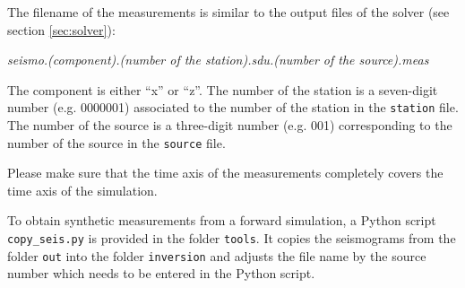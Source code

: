 	\medskip    
    	The filename of the measurements is similar to the output files of the solver (see section \ref{sec:solver}):
    	
    	\begin{center}%
				\emph{seismo.(component).(number of the station).sdu.(number of the source).meas}
		\end{center}
		
		The component is either ``x'' or ``z''. The number of the station is a seven-digit number (e.g. 0000001) associated to the number of the station in the \texttt{station} file. The number of the source is a three-digit number (e.g. 001) corresponding to the number of the source in the \texttt{source} file. 
		
		Please make sure that the time axis of the measurements completely covers the time axis of the simulation.
		
		To obtain synthetic measurements from a forward simulation, a Python script \texttt{copy\_seis.py} is provided in the folder \texttt{tools}. It copies the seismograms from the folder \texttt{out} into the folder \texttt{inversion} and adjusts the file name by the source number which needs to be entered in the Python script.
    	